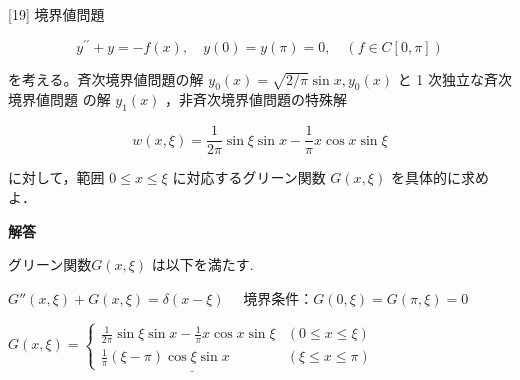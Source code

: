 \documentclass{jsarticle}
\begin{document}
\bigskip
\bigskip

\begin{itembox}[l]{[19]}
境界値問題


\begin{equation*}
y^{\prime \prime}+y=-f(x), \quad y(0)=y(\pi)=0, \quad(f \in C[0, \pi]) \tag{32}
\end{equation*}


を考える。斉次境界値問題の解 $y_{0}(x)=\sqrt{2 / \pi} \sin x, y_{0}(x)$ と 1 次独立な斉次境界値問題 の解 $y_{1}(x)$ ，非斉次境界値問題の特殊解


\begin{equation*}
w(x, \xi)=\frac{1}{2 \pi} \sin \xi \sin x-\frac{1}{\pi} x \cos x \sin \xi \tag{33}
\end{equation*}


に対して，範囲 $0 \leqslant x \leqslant \xi$ に対応するグリーン関数 $G(x, \xi)$ を具体的に求めよ．  
\end{itembox}

\textbf{解答}

グリーン関数$G(x, \xi)$ は以下を満たす.

$G''(x, \xi) + G(x, \xi) = \delta(x - \xi)$ \ \ 境界条件：$G(0,\xi) = G(\pi, \xi) = 0$

$\underline{G(x, \xi) = \begin{cases}
\frac{1}{2\pi} \sin\xi\sin x - \frac{1}{\pi}x\cos x\sin\xi & (0\le x\le\xi) \\
\frac{1}{\pi}(\xi - \pi) \cos\xi\sin x & (\xi\le x \le\pi)
\end{cases}}$

\bigskip
\bigskip
\end{document}
